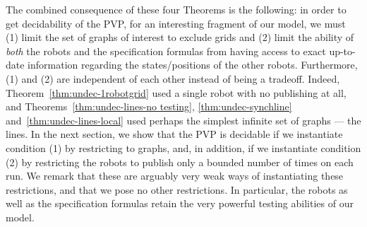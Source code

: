 The combined consequence of these four Theorems is the following: in order to get decidability of the PVP, for an interesting fragment of our model, we must (1) limit the set of graphs of interest to exclude grids and (2) limit the ability of \emph{both} the robots and the specification formulas from having access to exact up-to-date information regarding the states/positions of the other robots. Furthermore, (1) and (2) are independent of each other instead of being a tradeoff. Indeed, Theorem~\ref{thm:undec-1robotgrid} used a single robot with no publishing at all, and Theorems~\ref{thm:undec-lines-no testing}, \ref{thm:undec-synchline} 
and~\ref{thm:undec-lines-local} used perhaps the simplest infinite set of graphs --- the lines. In the next section, we show that the PVP is decidable if we instantiate condition (1) by restricting to \courcellian graphs, and, in addition, if we instantiate condition (2) by restricting the robots to publish only a bounded number of times on each run. We remark that these are arguably very weak ways of instantiating these restrictions, and that we pose no other restrictions. In particular, the robots as well as the specification formulas retain the very powerful testing abilities of our model.

